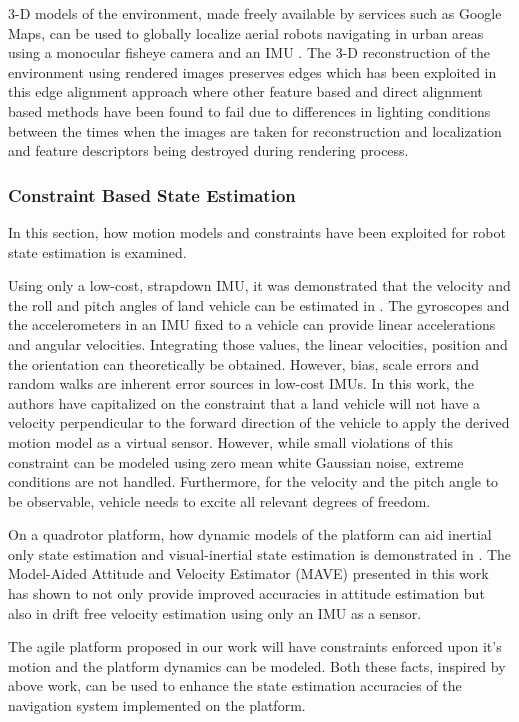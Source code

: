 \documentclass[12pt,a4paper]{report}
\begin{document}
3-D models of the environment, made freely available by services such as Google Maps, can be used to globally localize aerial robots navigating in urban areas using a monocular fisheye camera and an IMU \cite{Qiu2017model-based}. The 3-D reconstruction of the environment using rendered images preserves edges which has been exploited in this edge alignment approach where other feature based and direct alignment based methods have been found to fail due to differences in lighting conditions between the times when the images are taken for reconstruction and localization and feature descriptors being destroyed during rendering process. 

\subsubsection{Constraint Based State Estimation}
\label{litConstraintEstimation}
In this section, how motion models and constraints have been exploited for robot state estimation is examined.\par
Using only a low-cost, strapdown IMU, it was demonstrated that the velocity and the roll and pitch angles of  land vehicle can be estimated in \cite{770444} \cite{964672}. The gyroscopes and the accelerometers in an IMU fixed to a vehicle can provide linear accelerations and angular velocities. Integrating those values, the linear velocities, position and the orientation can theoretically be obtained. However, bias, scale errors and random walks are inherent error sources in low-cost IMUs. In this work, the authors have capitalized on the constraint that a land vehicle will not have a velocity perpendicular to the forward direction of the vehicle to apply the derived motion model as a virtual sensor. However, while small violations of this constraint can be modeled using zero mean white Gaussian noise, extreme conditions are not handled. Furthermore, for the velocity and the pitch angle to be observable, vehicle needs to excite all relevant degrees of freedom. 

On a quadrotor platform, how dynamic models of the platform can aid inertial only state estimation and visual-inertial state estimation is demonstrated in \cite{abeywardena2015model}. The Model-Aided Attitude and Velocity Estimator (MAVE) presented in this work has shown to not only provide improved accuracies in attitude estimation but also in drift free velocity estimation using only an IMU as a sensor. \par

The agile platform proposed in our work will have constraints enforced upon it's motion and the platform dynamics can be modeled. Both these facts, inspired by above work, can be used to enhance the state estimation accuracies of the navigation system implemented on the platform.
\end{document}

